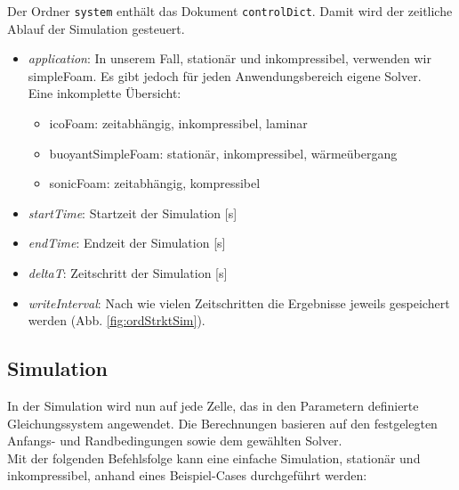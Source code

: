 Der Ordner \texttt{system} enthält das Dokument \texttt{controlDict}. Damit wird der zeitliche Ablauf der Simulation gesteuert.

\begin{itemize}
    \item \textit{application}: In unserem Fall, stationär und inkompressibel, 
    verwenden wir simpleFoam. Es gibt jedoch für jeden Anwendungsbereich eigene Solver.\\
    Eine inkomplette Übersicht:
    \begin{itemize}
        \item icoFoam: zeitabhängig, inkompressibel, laminar
        \item buoyantSimpleFoam: stationär, inkompressibel, wärmeübergang
        \item sonicFoam: zeitabhängig, kompressibel
    \end{itemize}
    \item \textit{startTime}: Startzeit der Simulation [s]
    \item \textit{endTime}: Endzeit der Simulation [s]
    \item \textit{deltaT}: Zeitschritt der Simulation [s]
    \item \textit{writeInterval}: Nach wie vielen Zeitschritten die Ergebnisse jeweils gespeichert werden (Abb. \ref{fig:ordStrktSim}).
\end{itemize}



\subsection{Simulation \label{openfoam:section:Simulation}}
In der Simulation wird nun auf jede Zelle, das in den Parametern definierte Gleichungssystem angewendet.
Die Berechnungen basieren auf den festgelegten Anfangs- und Randbedingungen sowie dem gewählten Solver.\\

Mit der folgenden Befehlsfolge kann eine einfache Simulation, stationär und inkompressibel, anhand eines Beispiel-Cases durchgeführt werden:

